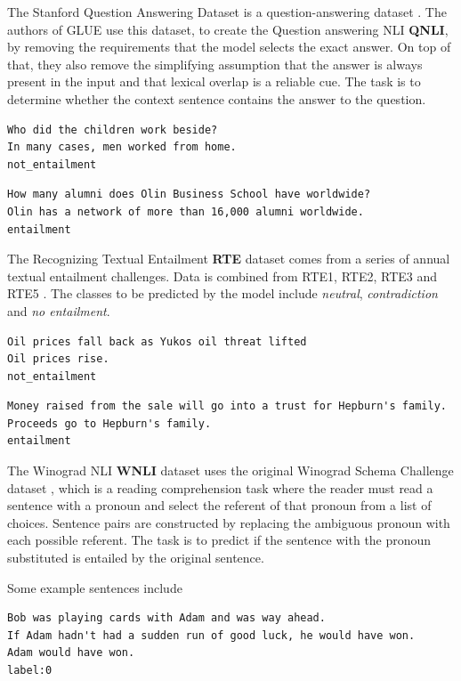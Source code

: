 \documentclass[a4paper,12pt,twoside,openright]{report}
\begin{document}
The Stanford Question Answering Dataset is a question-answering dataset \cite{rajpurkar2016}. 
The authors of GLUE use this dataset, to create the Question answering NLI \textbf{QNLI}, by removing the requirements that the model selects the exact answer.
On top of that, they also remove the simplifying assumption that the answer is always present in the input and that lexical overlap is a reliable cue.
The task is to determine whether the context sentence contains the answer to the question. 

\begin{verbatim}
Who did the children work beside?	
In many cases, men worked from home.
not_entailment
\end{verbatim}

\begin{verbatim}
How many alumni does Olin Business School have worldwide?
Olin has a network of more than 16,000 alumni worldwide.
entailment
\end{verbatim}


The Recognizing Textual Entailment \textbf{RTE}  dataset comes from a series of annual textual entailment challenges. 
Data is combined from RTE1, RTE2, RTE3 and RTE5 \cite{dagan2005} \cite{bar2006} \cite{bentivogli2009} \cite{giampiccolo2007}. 
The classes to be predicted by the model include \textit{neutral}, \textit{contradiction} and \textit{no entailment}.


\begin{verbatim}
Oil prices fall back as Yukos oil threat lifted	
Oil prices rise.
not_entailment
\end{verbatim}

\begin{verbatim}
Money raised from the sale will go into a trust for Hepburn's family.
Proceeds go to Hepburn's family.	
entailment
\end{verbatim}


The Winograd NLI \textbf{WNLI} dataset uses the original Winograd Schema Challenge dataset \cite{levesque2012}, which is a reading comprehension task where the reader must read a sentence with a pronoun and select the referent of that pronoun from a list of choices. 
Sentence pairs are constructed by replacing the ambiguous pronoun with each possible referent.
The task is to predict if the sentence with the pronoun substituted is entailed by the original sentence.

Some example sentences include 

\begin{verbatim}
Bob was playing cards with Adam and was way ahead.
If Adam hadn't had a sudden run of good luck, he would have won.	Adam would have won.
label:0
\end{verbatim}
\end{document}
